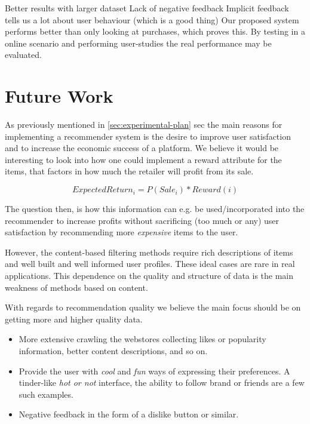 Better results with larger dataset
Lack of negative feedback
Implicit feedback tells us a lot about user behaviour (which is a good thing)
Our proposed system performs better than only looking at purchases, which
proves this.
By testing in a online scenario and performing user-studies the real
performance may be evaluated.





\clearpage
\section{Future Work}

As previously mentioned in \ref{sec:experimental-plan} sec the main reasons for
implementing a recommender system is the desire to improve user satisfaction
and to increase the economic success of a platform.  We believe it would be
interesting to look into how one could implement a reward attribute for the
items, that factors in how much the retailer will profit from its sale.

\begin{equation}
ExpectedReturn_i = P(Sale_i) * Reward(i)
\end{equation}

The question then, is how this information can e.g. be used/incorporated into
the recommender to increase profits without sacrificing (too much or any) user
satisfaction by recommending more \emph{expensive} items to the user.


However, the content-based filtering methods require rich descriptions of items
and well built and well informed user profiles. These ideal cases are rare in
real applications. This dependence on the quality and structure of data is the
main weakness of methods based on content.

With regards to recommendation quality we believe the main focus should be on
getting more and higher quality data.

\begin{itemize}
\item More extensive crawling the webstores collecting likes or popularity information, better content descriptions,
	  and so on.
\item Provide the user with \emph{cool} and \emph{fun} ways of expressing their preferences. A tinder-like \emph{hot or not}
	  interface, the ability to follow brand or friends are a few such examples.
\item Negative feedback in the form of a dislike button or similar.
\end{itemize}

